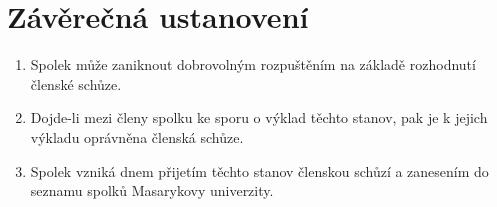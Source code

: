 \documentclass[11pt]{article}
\begin{document}
\section{Závěrečná ustanovení}
\begin{enumerate}
\item Spolek může zaniknout dobrovolným rozpuštěním na základě rozhodnutí členské schůze.
\item Dojde-li mezi členy spolku ke sporu o výklad těchto stanov, pak je k jejich výkladu oprávněna členská schůze.
\item Spolek vzniká dnem přijetím těchto stanov členskou schůzí a zanesením do seznamu spolků Masarykovy univerzity.
\end{enumerate}
\end{document}

